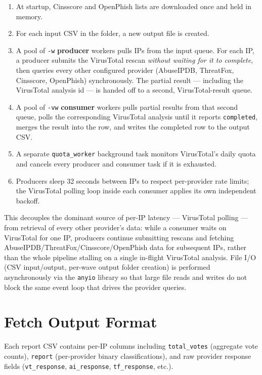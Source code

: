 \documentclass[12pt, a4paper, twoside]{report}
\begin{document}
\begin{enumerate}
  \item At startup, Cinsscore and OpenPhish lists are downloaded once and held in memory.
  \item For each input CSV in the folder, a new output file is created.
  \item A pool of \texttt{-w} \textbf{producer} workers pulls IPs from the input queue. For each IP,
    a producer submits the VirusTotal rescan \emph{without waiting for it to complete}, then queries
    every other configured provider (AbuseIPDB, ThreatFox, Cinsscore, OpenPhish) synchronously. The
    partial result --- including the VirusTotal analysis id --- is handed off to a second,
    VirusTotal-result queue.
  \item A pool of \texttt{-vw} \textbf{consumer} workers pulls partial results from that second
    queue, polls the corresponding VirusTotal analysis until it reports \texttt{completed}, merges
    the result into the row, and writes the completed row to the output CSV.
  \item A separate \texttt{quota\_worker} background task monitors VirusTotal's daily quota and
    cancels every producer and consumer task if it is exhausted.
  \item Producers sleep 32 seconds between IPs to respect per-provider rate limits; the VirusTotal
    polling loop inside each consumer applies its own independent backoff.
\end{enumerate}

This decouples the dominant source of per-IP latency --- VirusTotal polling --- from retrieval of
every other provider's data: while a consumer waits on VirusTotal for one IP, producers continue
submitting rescans and fetching AbuseIPDB/ThreatFox/Cinsscore/OpenPhish data for subsequent IPs,
rather than the whole pipeline stalling on a single in-flight VirusTotal analysis. File I/O (CSV
input/output, per-wave output folder creation) is performed asynchronously via the \texttt{anyio}
library so that large file reads and writes do not block the same event loop that drives the
provider queries.

\section{Fetch Output Format}

Each report CSV contains per-IP columns including \texttt{total\_votes} (aggregate vote counts),
\texttt{report} (per-provider binary classifications), and raw provider response fields
(\texttt{vt\_response}, \texttt{ai\_response}, \texttt{tf\_response}, etc.).
\end{document}
